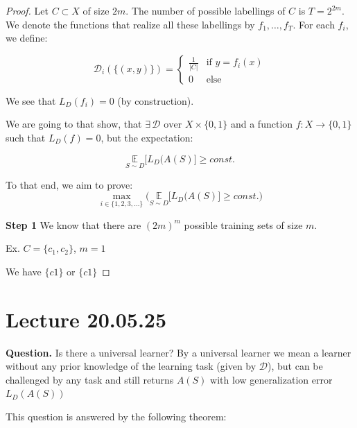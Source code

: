 \documentclass{scrarticle}
\begin{document}
\begin{proof}
Let $C \subset X$ of size $2m$. The number of possible labellings of $C$ is $T=2^{2m}$. We denote the functions that realize all these labellings by $f_1, \ldots ,f_T$. For each $f_i$, we define:

\begin{equation*}
    \mathcal{D}_i (\{(x,y)\}) = \begin{cases} \frac{1}{|C|} & \text{if } y=f_i(x) \\0 &  \text{else}\end{cases}
\end{equation*}


We see that $L_D(f_i) = 0$ (by construction).

We are going to that show, that $\exists\,\mathcal{D} \text{ over } X \times \{0,1\}$ and a function $f: X \to \{0,1\}$ such that $L_D(f)=0$, but the expectation: 

\begin{equation*}
\underset{S\sim D}{\mathbb{E}} \Big [ L_D(A(S) \Big ] \geq const.
\end{equation*}

To that end, we aim to prove: 
\begin{equation*}
    \max_{i \in \{1,2,3,\ldots\}} \Big ( \underset{S\sim D}{\mathbb{E}} \Big [ L_D(A(S) \Big ] \geq const. \Big )
\end{equation*}

\textbf{Step 1} We know that there are $(2m)^m$ possible training sets of size $m$. 

Ex. $C=\{c_1, c_2\}$, $m=1$

We have $\{c1\}$ or $\{c1\}$

\end{proof}


\section{Lecture 20.05.25}

\textbf{Question.} Is there a universal learner? By a universal learner we mean a learner without any prior knowledge of the learning task (given by $\mathcal{D}$), but can be challenged by any task and still returns $A(S)$ with low generalization error $L_D(A(S))$ 

This question is answered by the following theorem:
\end{document}
